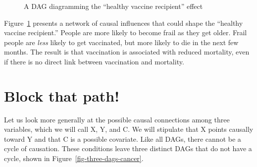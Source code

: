 \documentclass[
  letterpaper,
  DIV=11,
  numbers=noendperiod,
  oneside]{scrreprt}
\begin{document}
\begin{tcolorbox}
\begin{figure}[H]
{}

\caption{\label{fig-healthy-vaccine}A DAG diagramming the ``healthy
vaccine recipient'' effect}

\end{figure}

Figure~\ref{fig-healthy-vaccine} presents a network of causal influences
that could shape the ``healthy vaccine recipient.'' People are more
likely to become frail as they get older. Frail people are \emph{less}
likely to get vaccinated, but more likely to die in the next few months.
The result is that vaccination is associated with reduced mortality,
even if there is no direct link between vaccination and mortality.

\end{tcolorbox}

\hypertarget{block-that-path}{%
\section{Block that path!}\label{block-that-path}}

Let us look more generally at the possible causal connections among
three variables, which we will call X, Y, and C. We will stipulate that
X points causally toward Y and that C is a possible covariate. Like all
DAGs, there cannot be a cycle of causation. These conditions leave three
distinct DAGs that do not have a cycle, shown in
Figure~\ref{fig-three-dags-cancer}.
\end{document}
